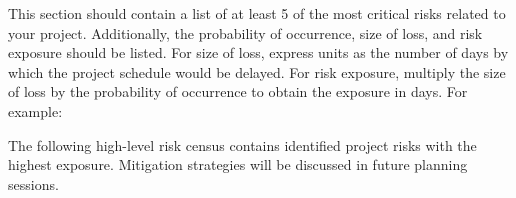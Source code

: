 This section should contain a list of at least 5 of the most critical risks related to your project. Additionally, the probability of occurrence, size of loss, and risk exposure should be listed. For size of loss, express units as the number of days by which the project schedule would be delayed. For risk exposure, multiply the size of loss by the probability of occurrence to obtain the exposure in days. For example:

The following high-level risk census contains identified project risks with the highest exposure. Mitigation strategies will be discussed in future planning sessions.

\begin{table}[h]
\caption{Overview of highest exposure project risks} 
\end{table}
